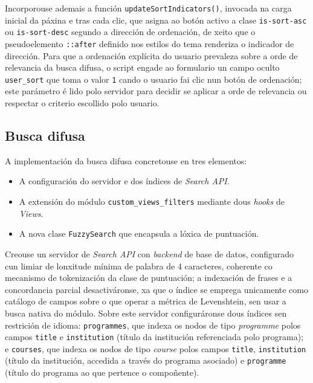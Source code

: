 \documentclass[%
    a4paper,               %
    twoside,               %
    10pt,                  %
]{article}                 %
\begin{document}
Incorporouse ademais a función \texttt{updateSortIndicators()}, invocada na carga inicial da páxina e tras cada clic, que asigna ao botón activo a clase \texttt{is-sort-asc} ou \texttt{is-sort-desc} segundo a dirección de ordenación, de xeito que o pseudoelemento \texttt{::after} definido nos estilos do tema renderiza o indicador de dirección. Para que a ordenación explícita do usuario prevaleza sobre a orde de relevancia da busca difusa, o script engade ao formulario un campo oculto \texttt{user\_sort} que toma o valor \texttt{1} cando o usuario fai clic nun botón de ordenación; este parámetro é lido polo servidor para decidir se aplicar a orde de relevancia ou respectar o criterio escollido polo usuario.

\subsection{Busca difusa}

A implementación da busca difusa concretouse en tres elementos:
\begin{itemize}
    \item A configuración do servidor e dos índices de \textit{Search API}.
    \item A extensión do módulo \texttt{custom\_views\_filters} mediante dous \textit{hooks} de \textit{Views}.
    \item A nova clase \texttt{FuzzySearch} que encapsula a lóxica de puntuación.
\end{itemize}

Creouse un servidor de \textit{Search API} con \textit{backend} de base de datos, configurado cun limiar de lonxitude mínima de palabra de 4 caracteres, coherente co mecanismo de tokenización da clase de puntuación; a indexación de frases e a concordancia parcial desactiváronse, xa que o índice se emprega unicamente como catálogo de campos sobre o que operar a métrica de Levenshtein, sen usar a busca nativa do módulo. Sobre este servidor configuráronse dous índices sen restrición de idioma: \texttt{programmes}, que indexa os nodos de tipo \textit{programme} polos campos \texttt{title} e \texttt{institution} (título da institución referenciada polo programa); e \texttt{courses}, que indexa os nodos de tipo \textit{course} polos campos \texttt{title}, \texttt{institution} (título da institución, accedida a través do programa asociado) e \texttt{programme} (título do programa ao que pertence o compoñente).
\end{document}

